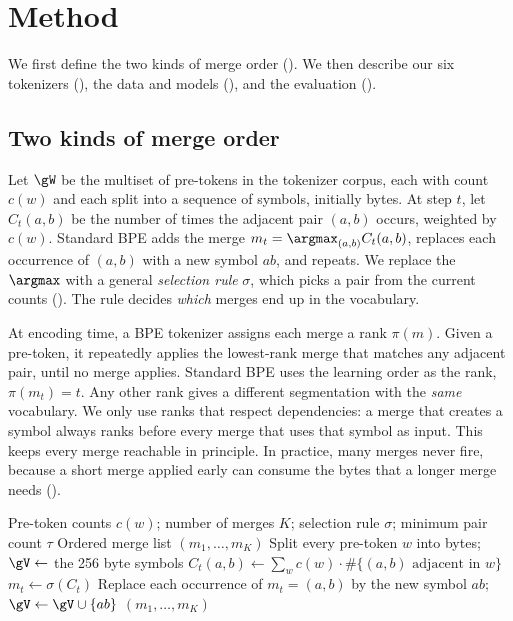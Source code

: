 \section{Method}
\label{sec:method}

We first define the two kinds of merge order ().
We then describe our six tokenizers (), the data and models (), and the evaluation ().

\subsection{Two kinds of merge order}
\label{sec:formulation}

Let $\gW$ be the multiset of pre-tokens in the tokenizer corpus, each with count $c(w)$ and each split into a sequence of symbols, initially bytes.
At step $t$, let $C_t(a,b)$ be the number of times the adjacent pair $(a,b)$ occurs, weighted by $c(w)$.
Standard BPE adds the merge $m_t = \argmax_{(a,b)} C_t(a,b)$, replaces each occurrence of $(a,b)$ with a new symbol $ab$, and repeats.
We replace the $\argmax$ with a general \emph{selection rule} $\sigma$, which picks a pair from the current counts ().
The rule decides \emph{which} merges end up in the vocabulary.

At encoding time, a BPE tokenizer assigns each merge a rank $\pi(m)$.
Given a pre-token, it repeatedly applies the lowest-rank merge that matches any adjacent pair, until no merge applies.
Standard BPE uses the learning order as the rank, $\pi(m_t)=t$.
Any other rank gives a different segmentation with the \emph{same} vocabulary.
We only use ranks that respect dependencies: a merge that creates a symbol always ranks before every merge that uses that symbol as input.
This keeps every merge reachable in principle.
In practice, many merges never fire, because a short merge applied early can consume the bytes that a longer merge needs ().

\begin{algorithm}[t]
\caption{BPE training with a general selection rule}
\label{alg:bpe}
\begin{algorithmic}[1]
\INPUT Pre-token counts $c(w)$; number of merges $K$; selection rule $\sigma$; minimum pair count $\tau$
\OUTPUT Ordered merge list $(m_1,\dots,m_K)$
\State Split every pre-token $w$ into bytes; $\gV \gets$ the 256 byte symbols
    \State $C_t(a,b) \gets \sum_{w} c(w)\cdot \#\{(a,b) \text{ adjacent in } w\}$ 
    \State $m_t \gets \sigma(C_t)$ 
    \State Replace each occurrence of $m_t=(a,b)$ by the new symbol $ab$; $\gV \gets \gV \cup \{ab\}$
\EndFor
\State \Return $(m_1,\dots,m_K)$ 
\end{algorithmic}
\end{algorithm}

